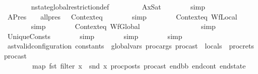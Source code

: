 \begin{isabellebody}
\ \ \ \ \ \ \isamarkupfalse%
\ nstate{\isacharunderscore}{\kern0pt}global{\isacharunderscore}{\kern0pt}restriction{\isacharunderscore}{\kern0pt}def\ \isanewline
\ \ \ \ \ \ \isamarkupfalse%
\ AxSat\isanewline
\ \ \ \ \ \ \isamarkupfalse%
\ simp\isanewline
\ \ \ \ \ \ \isamarkupfalse%
\ APres\ {\isacartoucheopen}{\isasymOmega}\ {\isacharequal}{\kern0pt}\ {\isacharbrackleft}{\kern0pt}{\isacharbrackright}{\kern0pt}{\isacartoucheclose}\ {\isacartoucheopen}all{\isacharunderscore}{\kern0pt}pres\ {\isacharequal}{\kern0pt}\ {\isacharunderscore}{\kern0pt}{\isacartoucheclose}\ Contexteq\isanewline
\ \ \ \ \ \ \isamarkupfalse%
\ simp\isanewline
\ \ \ \ \ \ \isamarkupfalse%
\ Contexteq\ WfLocal\ {\isacartoucheopen}{\isasymOmega}\ {\isacharequal}{\kern0pt}\ {\isacharbrackleft}{\kern0pt}{\isacharbrackright}{\kern0pt}{\isacartoucheclose}\isanewline
\ \ \ \ \ \ \isamarkupfalse%
\ simp\isanewline
\ \ \ \ \ \ \isamarkupfalse%
\ Contexteq\ WfGlobal\ {\isacartoucheopen}{\isasymOmega}\ {\isacharequal}{\kern0pt}\ {\isacharbrackleft}{\kern0pt}{\isacharbrackright}{\kern0pt}{\isacartoucheclose}\ \ \ \ \ \ \isanewline
\ \ \ \ \ \ \isamarkupfalse%
\ simp\isanewline
\ \ \ \ \ \ \isamarkupfalse%
\ UniqueConsts\isanewline
\ \ \ \ \ \ \isamarkupfalse%
\ simp\isanewline
\ \ \ \ \ \ \isamarkupfalse%
\ simp\isanewline
\ \ \ \ \ \ \isamarkupfalse%
\ simp\isanewline
\ \ \ \ \ \ \isamarkupfalse%
\isanewline
\ \ \ \ \isamarkupfalse%
\ {\isachardoublequoteopen}ast{\isacharunderscore}{\kern0pt}valid{\isacharunderscore}{\kern0pt}configuration\ {\isacharparenleft}{\kern0pt}constants\ {\isacharat}{\kern0pt}\ global{\isacharunderscore}{\kern0pt}vars{\isacharcomma}{\kern0pt}\ proc{\isacharunderscore}{\kern0pt}args\ proc{\isacharunderscore}{\kern0pt}ast\ {\isacharat}{\kern0pt}\ locals\ {\isacharat}{\kern0pt}\ proc{\isacharunderscore}{\kern0pt}rets\ proc{\isacharunderscore}{\kern0pt}ast{\isacharparenright}{\kern0pt}\ {\isasymGamma}\ {\isasymOmega}\isanewline
\ \ \ \ \ \ \ \ {\isacharparenleft}{\kern0pt}map\ fst\ {\isacharparenleft}{\kern0pt}filter\ {\isacharparenleft}{\kern0pt}{\isasymlambda}x{\isachardot}{\kern0pt}\ {\isasymnot}\ snd\ x{\isacharparenright}{\kern0pt}\ {\isacharparenleft}{\kern0pt}proc{\isacharunderscore}{\kern0pt}posts\ proc{\isacharunderscore}{\kern0pt}ast{\isacharparenright}{\kern0pt}{\isacharparenright}{\kern0pt}{\isacharparenright}{\kern0pt}\ end{\isacharunderscore}{\kern0pt}bb\ end{\isacharunderscore}{\kern0pt}cont\ end{\isacharunderscore}{\kern0pt}state{\isachardoublequoteclose}\isanewline

\end{isabellebody}
